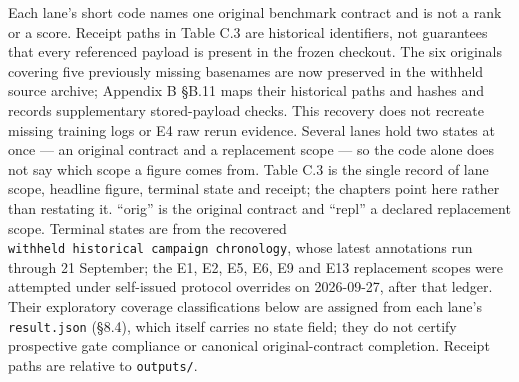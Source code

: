 \documentclass[12pt,a4paper]{report}
\begin{document}
Each lane's short code names one original benchmark contract and is not
a rank or a score. Receipt paths in Table C.3 are historical
identifiers, not guarantees that every referenced payload is present in
the frozen checkout. The six originals covering five previously missing
basenames are now preserved in the withheld source archive; Appendix B
§B.11 maps their historical paths and hashes and records supplementary
stored-payload checks. This recovery does not recreate missing training
logs or E4 raw rerun evidence. Several lanes hold two states at once ---
an original contract and a replacement scope --- so the code alone does
not say which scope a figure comes from. Table C.3 is the single record
of lane scope, headline figure, terminal state and receipt; the chapters
point here rather than restating it. ``orig'' is the original contract
and ``repl'' a declared replacement scope. Terminal states are from the
recovered \texttt{withheld\ historical\ campaign\ chronology}, whose
latest annotations run through 21 September; the E1, E2, E5, E6, E9 and
E13 replacement scopes were attempted under self-issued protocol
overrides on 2026-09-27, after that ledger. Their exploratory coverage
classifications below are assigned from each lane's \texttt{result.json}
(§8.4), which itself carries no state field; they do not certify
prospective gate compliance or canonical original-contract completion.
Receipt paths are relative to \texttt{outputs/}.
\end{document}
